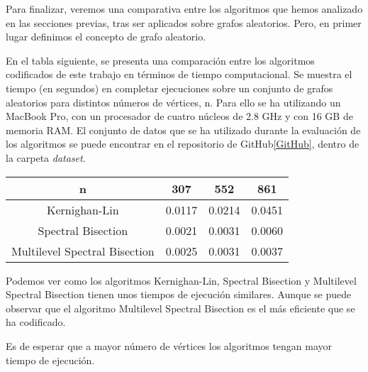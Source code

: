 Para finalizar, veremos una comparativa entre los algoritmos que hemos analizado en las secciones previas, tras ser aplicados sobre grafos aleatorios. Pero, en primer lugar definimos el concepto de grafo aleatorio.

En el tabla siguiente, se presenta una comparación entre los algoritmos codificados de este trabajo en términos de tiempo computacional. Se muestra el tiempo (en segundos) en completar ejecuciones sobre un conjunto de grafos aleatorios para distintos números de vértices, n. Para ello se ha utilizando un MacBook Pro, con un procesador de cuatro núcleos de 2.8 GHz y con 16 GB de memoria RAM. El conjunto de datos que se ha utilizado durante la evaluación de los algoritmos se puede encontrar en el repositorio de GitHub\ref{GitHub}, dentro de la carpeta \textit{dataset}.

\begin{center}
	\begin{tabular}{|c|c|c|c|}
		\hline
		n & 307 & 552 & 861 \\
		\hline
		Kernighan-Lin & 0.0117 & 0.0214 & 0.0451\\
		\hline
		Spectral Bisection & 0.0021 & 0.0031 & 0.0060 \\
		\hline
		Multilevel Spectral Bisection & 0.0025 & 0.0031 & 0.0037 \\ 
		\hline
	\end{tabular}
\end{center}

Podemos ver como los algoritmos Kernighan-Lin, Spectral Bisection y Multilevel Spectral Bisection tienen unos tiempos de ejecución similares. Aunque se puede observar que el algoritmo Multilevel Spectral Bisection es el más eficiente que se ha codificado.

Es de esperar que a mayor número de vértices los algoritmos tengan mayor tiempo de ejecución.